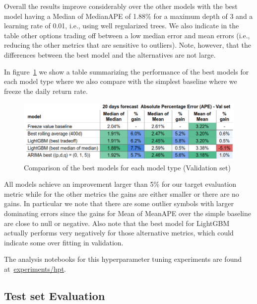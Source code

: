 \documentclass[10pt]{article}
\begin{document}
Overall the results improve considerably over the other models with the
best model having a Median of MedianAPE of 1.88\% for a maximum depth of
3 and a learning rate of 0.01, i.e., using well regularized trees. We
also indicate in the table other options trading off between a low
median error and mean errors (i.e., reducing the other metrics that are
sensitive to outliers). Note, however, that the differences between the
best model and the alternatives are not large.~

In figure~{\ref{343251}} we show a table summarizing the
performance of the best models for each model type where we also compare
with the simplest baseline where we freeze the daily return rate.

\par\null{}
\begin{figure}[H]
\begin{center}
\includegraphics[width=0.84\columnwidth]{figures/screenshot71/screenshot71}
\caption{{Comparison of the best models for each model type (Validation set)
{\label{343251}}%
}}
\end{center}
\end{figure}

All models achieve an improvement larger than 5\% for our target
evaluation metric while for the other metrics the gains are either
smaller or there are no gains. In particular we note that there are some
outlier symbols with larger dominating errors since the gains for Mean
of MeanAPE over the simple baseline are close to null or negative. Also
note that the best model for LightGBM actually performs very negatively
for those alternative metrics, which could indicate some over fitting in
validation.~

The analysis notebooks for this hyperparameter tuning experiments are
found
at~\href{https://github.com/marcoopsampaio/aws_ml_eng_project_stock_prediction/tree/main/experiments/hpt}{experiments/hpt}.

\subsection{Test set Evaluation}
\end{document}
